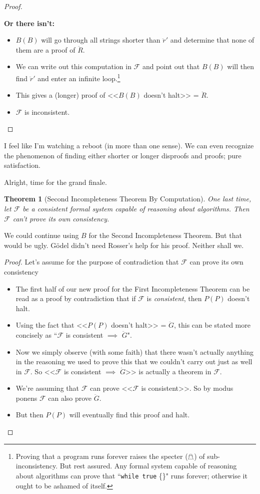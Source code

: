 \documentclass{article}
\theoremstyle{theorem}
\newtheorem{theorem}{Theorem}
\newcommand{\nameditem}[1]{\item\textbf{#1}}
\newcommand{\impl}{\item[$\Rightarrow$]}
\begin{document}
\begin{proof}
\begin{description}
\begin{description}
\begin{itemize}
\end{itemize}
\nameditem{Or there isn't:}
\begin{itemize}
\impl $B(B)$ will go through all strings shorter than $\ddot{r}'$ and determine that none of them are a proof of $\ddot{R}$.
\impl We can write out this computation in $\mathcal{F}$ and point out that $B(B)$ will then find $\ddot{r}'$ and enter an infinite loop.\footnote{Proving that a program runs forever raises the specter ($\mathghost$) of sub-inconsistency. But rest assured. Any formal system capable of reasoning about algorithms can prove that ``\lstinline{while true} \{\}" runs forever; otherwise it ought to be ashamed of itself.}
\impl This gives a (longer) proof of <<$B(B)$ doesn't halt>> = $\ddot{R}$.
\impl $\mathcal{F}$ is inconsistent. \lightning
\end{itemize}
\end{description}
\end{description}
\end{proof}

I feel like I'm watching a reboot (in more than one sense). We can even recognize the phenomenon of finding either shorter or longer disproofs and proofs; pure satisfaction.

Alright, time for the grand finale.

\begin{theorem}[Second Incompleteness Theorem By Computation]
One last time, let $\mathcal{F}$ be a consistent formal system capable of reasoning about algorithms. Then $\mathcal{F}$ can't prove its own consistency.
\end{theorem}

We could continue using $B$ for the Second Incompleteness Theorem. But that would be ugly. Gödel didn't need Rosser's help for his proof. Neither shall we.

\begin{proof}
Let's assume for the purpose of contradiction that $\mathcal{F}$ can prove its own consistency
\begin{itemize}
\impl The first half of our new proof for the First Incompleteness Theorem can be read as a proof by contradiction that if $\mathcal{F}$ is \textit{consistent}, then $P(P)$ doesn't halt.
\impl Using the fact that <<$P(P)$ doesn't halt>> = $\ddot{G}$, this can be stated more concisely as ``$\mathcal{F}$ is consistent $\implies$ $\ddot{G}$".
\impl Now we simply observe (with some faith) that there wasn't actually anything in the reasoning we used to prove this that we couldn't carry out just as well in $\mathcal{F}$. So <<$\mathcal{F}$ is consistent $\implies$ $\ddot{G}$>> is actually a theorem in $\mathcal{F}$.
\impl We're assuming that $\mathcal{F}$ can prove <<$\mathcal{F}$ is consistent>>. So by modus ponens $\mathcal{F}$ can also prove $\ddot{G}$.
\impl But then $P(P)$ will eventually find this proof and halt. \lightning
\end{itemize}
\end{proof}
\end{document}
